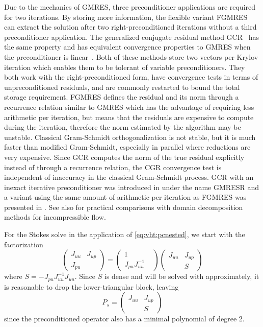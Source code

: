 Due to the mechanics of GMRES, three preconditioner applications are required for two iterations.
By storing more information, the flexible variant FGMRES~\citep{saad1993fgmres} can extract the solution after two right-preconditioned iterations without a third preconditioner application.
The generalized conjugate residual method GCR~\citep{eisenstat1983variational} has the same property and has equivalent convergence properties to GMRES when the preconditioner is linear~\cite{saad1986gmres}.
Both of these methods store two vectors per Krylov iteration which enables them to be tolerant of variable preconditioners.
They both work with the right-preconditioned form, have convergence tests in terms of unpreconditioned residuals, and are commonly restarted to bound the total storage requirement.
FGMRES defines the residual and its norm through a recurrence relation similar to GMRES which has the advantage of requiring less arithmetic per iteration, but means that the residuals are expensive to compute during the iteration, therefore the norm estimated by the algorithm may be unstable.
Classical Gram-Schmidt orthogonalization is not stable, but it is much faster than modified Gram-Schmidt, especially in parallel where reductions are very expensive.
Since GCR computes the norm of the true residual explicitly instead of through a recurrence relation, the CGR convergence test is independent of inaccuracy in the classical Gram-Schmidt process.
GCR with an inexact iterative preconditioner was introduced in \citet{vandervorst1994gmresr} under the name GMRESR and a variant using the same amount of arithmetic per iteration as FGMRES was presented in \citet{vuik1995new}.
See also \citet{brakkee1998domain} for practical comparisons with domain decomposition methods for incompressible flow.

For the Stokes solve in the application of \eqref{eq:vht:pcnested}, we start with the factorization
\begin{equation*}
  \begin{pmatrix}
    J_{uu} & J_{up} \\
    J_{pu} & 
  \end{pmatrix} =
  \begin{pmatrix}
    1 & \\ J_{pu} J_{uu}^{-1}
  \end{pmatrix}
  \begin{pmatrix}
    J_{uu} & J_{up} \\
    & S
  \end{pmatrix}
\end{equation*}
where $S = -J_{pu} J_{uu}^{-1}J_{uu}$.
Since $S$ is dense and will be solved with approximately, it is reasonable to drop the lower-triangular block, leaving
\begin{equation}\label{eq:vht:pcstokes}
  P_s =
  \begin{pmatrix}
    J_{uu} & J_{up} \\
    & S
  \end{pmatrix}
\end{equation}
since the preconditioned operator also has a minimal polynomial of degree 2.

